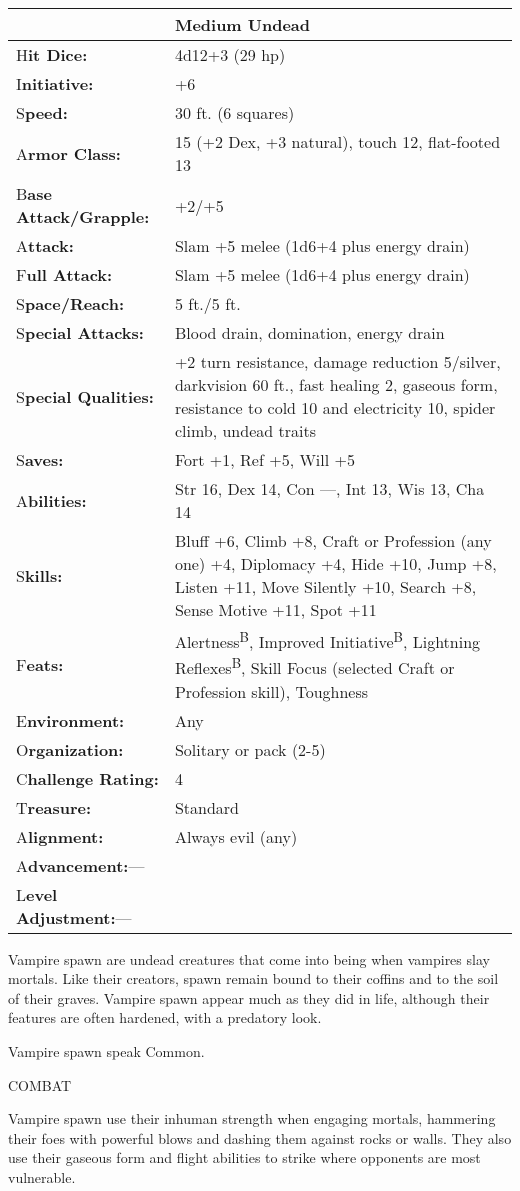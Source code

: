 \documentclass{article}
\begin{document}
\begin{tabular}{|>{\raggedright}p{91pt}|>{\raggedright}p{213pt}|}
\hline
  & Medium Undead\tabularnewline
\hline
H\textbf{it Dice:} & 4d12+3 (29 hp)\tabularnewline
\hline
I\textbf{nitiative:} & +6\tabularnewline
\hline
S\textbf{peed:} & 30 ft. (6 squares)\tabularnewline
\hline
A\textbf{rmor Class:} & 15 (+2 Dex, +3 natural), touch 12, flat-footed 13\tabularnewline
\hline
B\textbf{ase Attack/Grapple:} & +2/+5\tabularnewline
\hline
A\textbf{ttack:} & Slam +5 melee (1d6+4 plus energy drain)\tabularnewline
\hline
F\textbf{ull Attack:} & Slam +5 melee (1d6+4 plus energy drain)\tabularnewline
\hline
S\textbf{pace/Reach:} & 5 ft./5 ft.\tabularnewline
\hline
S\textbf{pecial Attacks:} & Blood drain, domination, energy drain\tabularnewline
\hline
S\textbf{pecial Qualities:} & +2 turn resistance, damage reduction 5/silver, darkvision 
60 ft., fast healing 2, gaseous form, resistance to cold 10 and electricity 10, 
spider climb, undead traits\tabularnewline
\hline
S\textbf{aves:} & Fort +1, Ref +5, Will +5\tabularnewline
\hline
A\textbf{bilities:} & Str 16, Dex 14, Con ---, Int 13, Wis 13, Cha 14\tabularnewline
\hline
S\textbf{kills:} & Bluff +6, Climb +8, Craft or Profession (any one) +4, Diplomacy 
+4, Hide +10, Jump +8, Listen +11, Move Silently +10, Search +8, Sense Motive +11, 
Spot +11\tabularnewline
\hline
F\textbf{eats:} & Alertness\textsuperscript{B}, Improved Initiative\textsuperscript{B}, 
Lightning Reflexes\textsuperscript{B}, Skill Focus (selected Craft or Profession 
skill), Toughness\tabularnewline
\hline
E\textbf{nvironment:} & Any\tabularnewline
\hline
O\textbf{rganization:} & Solitary or pack (2-5)\tabularnewline
\hline
C\textbf{hallenge Rating:} & 4\tabularnewline
\hline
T\textbf{reasure:} & Standard\tabularnewline
\hline
A\textbf{lignment:} & Always evil (any)\tabularnewline
\hline
A\textbf{dvancement:}--- & \tabularnewline
\hline
L\textbf{evel Adjustment:}--- & \tabularnewline
\hline
\end{tabular}

Vampire spawn are undead creatures that come into being when vampires slay mortals. 
Like their creators, spawn remain bound to their coffins and to the soil of their 
graves. Vampire spawn appear much as they did in life, although their features 
are often hardened, with a predatory look.

Vampire spawn speak Common.

COMBAT

Vampire spawn use their inhuman strength when engaging mortals, hammering their 
foes with powerful blows and dashing them against rocks or walls. They also use 
their gaseous form and flight abilities to strike where opponents are most vulnerable.
\end{document}
